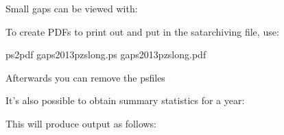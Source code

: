 \documentclass[letterpaper,10pt,english]{sphinxmanual}
\begin{document}
Small gaps can be viewed with:


To create PDFs to print out and put in the sat\sphinxhyphen{}archiving file, use:


ps2pdf gaps\sphinxhyphen{}2013\sphinxhyphen{}pzs\sphinxhyphen{}long.ps gaps\sphinxhyphen{}2013\sphinxhyphen{}pzs\sphinxhyphen{}long.pdf

Afterwards you can remove the ps\sphinxhyphen{}files

It’s also possible to obtain summary statistics for a year:


This will produce output as follows:
\end{document}
